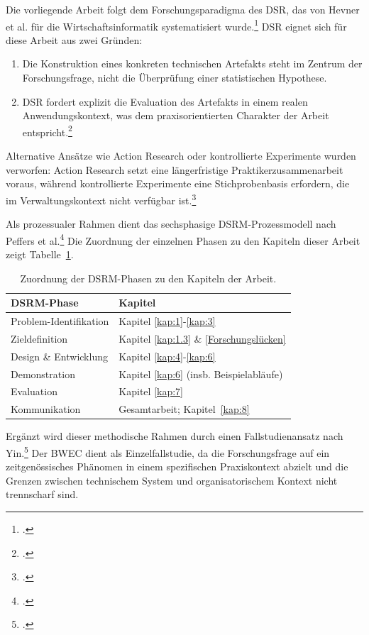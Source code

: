 Die vorliegende Arbeit folgt dem Forschungsparadigma des \ac{DSR}, das von Hevner et al. für die Wirtschaftsinformatik systematisiert wurde.\footcite[Vgl.][]{hevner2004dsr} \ac{DSR} eignet sich für diese Arbeit aus zwei Gründen:
\begin{enumerate}
    \item Die Konstruktion eines konkreten technischen Artefakts steht im Zentrum der Forschungsfrage, nicht die Überprüfung einer statistischen Hypothese.
    \item \ac{DSR} fordert explizit die Evaluation des Artefakts in einem realen Anwendungskontext, was dem praxisorientierten Charakter der Arbeit entspricht.\footcite[Vgl.][S. 80]{hevner2004dsr}
\end{enumerate}

Alternative Ansätze wie \mbox{Action} Research oder kontrollierte Experimente wurden verworfen: \mbox{Action} Research setzt eine längerfristige Praktikerzusammenarbeit voraus, während kontrollierte Experimente eine Stichprobenbasis erfordern, die im Verwaltungskontext nicht verfügbar ist.\footcites[Vgl.][S. 1--2]{baskerville1999ar}[][S. 239--335]{baskerville2004ar}

Als prozessualer Rahmen dient das sechsphasige DSRM-Prozessmodell nach Peffers et al.\footcite[Vgl.][]{peffers2007dsrm} Die Zuordnung der einzelnen Phasen zu den Kapiteln dieser Arbeit zeigt Tabelle~\ref{tab:dsrm_mapping}.

\begin{table}[htbp]
\centering
\begin{tabular}{|l|l|}
\hline
\textbf{DSRM-Phase} & \textbf{Kapitel} \\
\hline
Problem-Identifikation & Kapitel \ref{kap:1}-\ref{kap:3} \\
Zieldefinition & Kapitel \ref{kap:1.3} \& \ref{Forschungslücken} \\
Design \& Entwicklung & Kapitel \ref{kap:4}-\ref{kap:6} \\
Demonstration & Kapitel \ref{kap:6} (insb. Beispielabläufe) \\
Evaluation & Kapitel \ref{kap:7} \\
Kommunikation & Gesamtarbeit; Kapitel~\ref{kap:8} \\
\hline
\end{tabular}
\caption{Zuordnung der DSRM-Phasen zu den Kapiteln der Arbeit.}
\label{tab:dsrm_mapping}
\end{table}

Ergänzt wird dieser methodische Rahmen durch einen Fallstudienansatz nach Yin.\footcite[Vgl.][]{yin_case_2018} Der \ac{BWEC} dient als Einzelfallstudie, da die Forschungsfrage auf ein zeitgenössisches Phänomen in einem spezifischen Praxiskontext abzielt und die Grenzen zwischen technischem System und organisatorischem Kontext nicht trennscharf sind.

